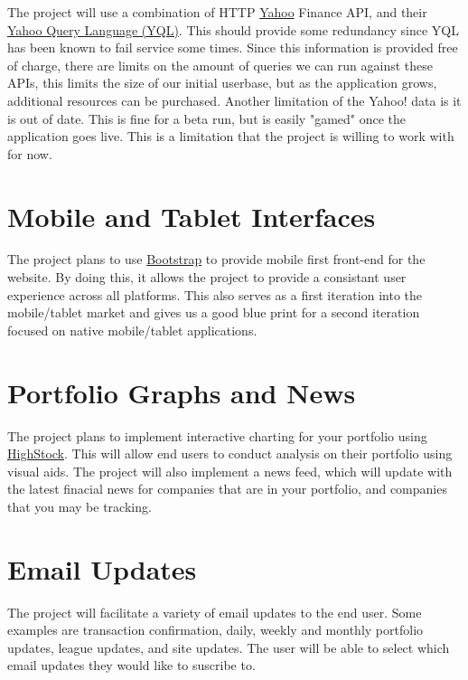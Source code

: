 \documentclass[11pt,letterpaper,oneside]{memoir}
\begin{document}
The project will use a combination of HTTP \href{http://www.yahoo.com}{Yahoo} Finance API, and
their \href{http://http://developer.yahoo.com/yql/}{Yahoo Query Language (YQL)}.  This should
provide some redundancy since YQL has been known to fail service some times.  Since this
information is provided free of charge, there are limits on the amount of queries we can run
against these APIs, this limits the size of our initial userbase, but as the application
grows, additional resources can be purchased.  Another limitation of the Yahoo! data is it
is out of date.  This is fine for a beta run, but is easily "gamed" once the application goes
live.  This is a limitation that the project is willing to work with for now.

\section{Mobile and Tablet Interfaces}

The project plans to use \href{http://getbootstrap.com}{Bootstrap} to provide mobile first
front-end for the website.  By doing this, it allows the project to provide a consistant
user experience across all platforms.  This also serves as a first iteration into the
mobile/tablet market and gives us a good blue print for a second iteration focused on
native mobile/tablet applications.

\section{Portfolio Graphs and News}

The project plans to implement interactive charting for your portfolio using
\href{http://www.highcharts.com/products/highstock}{HighStock}.  This will allow
end users to conduct analysis on their portfolio using visual aids.  The project
will also implement a news feed, which will update with the latest finacial news
for companies that are in your portfolio, and companies that you may be tracking.

\section{Email Updates}

The project will facilitate a variety of email updates to the end user.  Some examples are
transaction confirmation, daily, weekly and monthly portfolio updates, league updates, and
site updates.  The user will be able to select which email updates they would like to suscribe
to.
\end{document}
